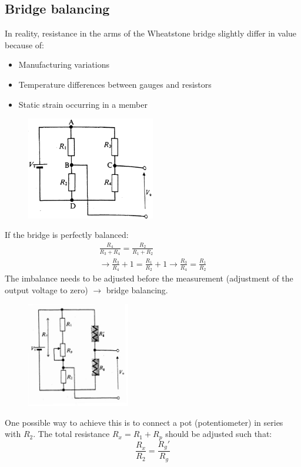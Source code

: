 \documentclass[class=report, crop=false, 12pt,a4paper]{standalone}
\begin{document}
\subsection{Bridge balancing}
In reality, resistance in the arms of the Wheatstone bridge slightly differ in value because of: 
\begin{itemize}
  \item Manufacturing variations
  \item Temperature differences between gauges and resistors
  \item Static strain occurring in a member
\end{itemize}
\begin{figure}[H]
  \centering
  \includegraphics[width = 0.5\textwidth]{../img/diagram18.png}
\end{figure}
If the bridge is perfectly balanced:
\begin{gather}
  \frac{R_4}{R_3 + R_4} = \frac{R_2}{R_1 +R_2}\\
  \rightarrow \frac{R_3}{R_4} + 1 = \frac{R_1}{R_2} +1 \rightarrow \frac{R_3}{R_4} = \frac{R_1}{R_2}
\end{gather}
The imbalance needs to be adjusted before the measurement (adjustment of the output voltage to zero) $\rightarrow$ bridge balancing. 
\begin{figure}[H]
  \centering
  \includegraphics[width = 0.4\textwidth]{../img/edit1.jpeg}
\end{figure}
One possible way to achieve this is to connect a pot (potentiometer) in series with $R_2$. The total resistance $R_x = R_1 + R_p$ should be adjusted such that:
\begin{equation}
  \frac{R_x}{R_2} = \frac{R_g'}{R_g}
\end{equation}
\end{document}
